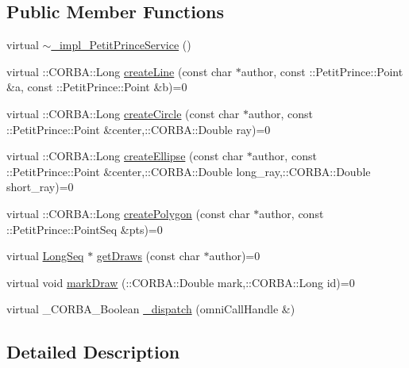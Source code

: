 \subsection*{Public Member Functions}
\begin{DoxyCompactItemize}
\item 
virtual \hyperlink{class__impl___petit_prince_service_a477c2f68aac99912c47455657764b266}{$\sim$\+\_\+impl\+\_\+\+Petit\+Prince\+Service} ()
\item 
virtual \+::C\+O\+R\+B\+A\+::\+Long \hyperlink{class__impl___petit_prince_service_a7d0f1d9c237b859cba5e5d98ef248069}{create\+Line} (const char $\ast$author, const \+::Petit\+Prince\+::\+Point \&a, const \+::Petit\+Prince\+::\+Point \&b)=0
\item 
virtual \+::C\+O\+R\+B\+A\+::\+Long \hyperlink{class__impl___petit_prince_service_a8b07dfb70c61bb9d6367bacf1a0230d3}{create\+Circle} (const char $\ast$author, const \+::Petit\+Prince\+::\+Point \&center,\+::C\+O\+R\+B\+A\+::\+Double ray)=0
\item 
virtual \+::C\+O\+R\+B\+A\+::\+Long \hyperlink{class__impl___petit_prince_service_ad8fb48af108a078b4ee0a3679a72499f}{create\+Ellipse} (const char $\ast$author, const \+::Petit\+Prince\+::\+Point \&center,\+::C\+O\+R\+B\+A\+::\+Double long\+\_\+ray,\+::C\+O\+R\+B\+A\+::\+Double short\+\_\+ray)=0
\item 
virtual \+::C\+O\+R\+B\+A\+::\+Long \hyperlink{class__impl___petit_prince_service_a89b8c0ca5d95f6712916a5e781f1f9ed}{create\+Polygon} (const char $\ast$author, const \+::Petit\+Prince\+::\+Point\+Seq \&pts)=0
\item 
virtual \hyperlink{class_long_seq}{Long\+Seq} $\ast$ \hyperlink{class__impl___petit_prince_service_af45641fd3b57ebe1debe37abf0550bba}{get\+Draws} (const char $\ast$author)=0
\item 
virtual void \hyperlink{class__impl___petit_prince_service_aa89e2ba56851bcc143f01f8d96fd1e42}{mark\+Draw} (\+::C\+O\+R\+B\+A\+::\+Double mark,\+::C\+O\+R\+B\+A\+::\+Long id)=0
\item 
virtual \+\_\+\+C\+O\+R\+B\+A\+\_\+\+Boolean \hyperlink{class__impl___petit_prince_service_ac4dc7df1a3329636533b195a84932940}{\+\_\+dispatch} (omni\+Call\+Handle \&)
\end{DoxyCompactItemize}


\subsection{Detailed Description}


